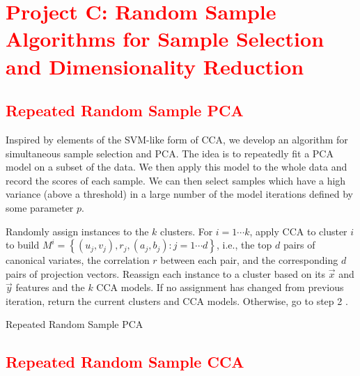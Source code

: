 \section{\textcolor{red}{\textbf{Project C:} Random Sample Algorithms for Sample Selection and Dimensionality Reduction}}

\subsection{\textcolor{red}{Repeated Random Sample PCA}}

Inspired by elements of the SVM-like form of CCA, we develop an algorithm for simultaneous sample selection and PCA. The idea is to repeatedly fit a PCA model on a subset of the data. We then apply this model to the whole data and record the scores of each sample. We can then select samples which have a high variance (above a threshold) in a large number of the model iterations defined by some parameter $p$.

\vspace{\baselineskip}
\begin{algorithm}
\begin{algorithmic}[1]
    \STATE Randomly assign instances to the $k$ clusters.
    \STATE For $i=1 \cdots k$, apply CCA to cluster $i$ to build $M^{i}=\left\{\left(u_{j}, v_{j}\right), r_{j},\left(a_{j}, b_{j}\right): j=1 \cdots d\right\}$, i.e., the top $d$ pairs of canonical variates, the correlation $r$ between each pair, and the corresponding $d$ pairs of projection vectors.
    \STATE Reassign each instance to a cluster based on its $\vec{x}$ and $\vec{y}$ features and the $k$ CCA models.
    \STATE If no assignment has changed from previous iteration, return the current clusters and CCA models. Otherwise, go to step 2 .
\ENDWHILE
\caption[Repeated Random Sample PCA]{Repeated Random Sample PCA}
\label{Repeated Random Sample PCA}
\end{algorithmic}
\end{algorithm}

\subsection{\textcolor{red}{Repeated Random Sample CCA}}

